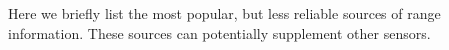 \documentclass[twocolumn,oneside]{book}
\begin{document}
Here we briefly list the most popular, but less reliable sources of range
information. These sources can potentially supplement other sensors.
\begin{itemize}








\end{itemize}
\end{document}
